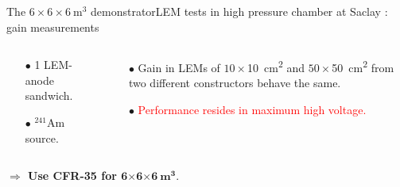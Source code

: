 \documentclass[10pt]{beamer}
\begin{document}
\begin{frame}{The \texorpdfstring{$6 \times 6 \times \SI{6}{\meter\cubed}$}{666} demonstrator}{LEM tests in high pressure chamber at Saclay : gain measurements}
\begin{scriptsize}
\begin{columns}
    			\begin{column}{0.38\textwidth}
    				\begin{itemize}
    					\item[$\bullet$] 1 LEM-anode sandwich.
    					\item[$\bullet$] $^{241}$Am source.
    				\end{itemize}
    			\end{column}\hfill
    			\begin{column}{0.58\textwidth}
    				\begin{itemize}
    					\item[$\bullet$] Gain in LEMs of $10\times$\SI{10}{\centi\meter\squared} and $50\times$\SI{50}{\centi\meter\squared} from two different constructors behave the same.
    					\item[$\bullet$] \textcolor{red}{Performance resides in maximum high voltage.}
    				\end{itemize}
    			\end{column}
    		\end{columns}
    		\vfill
    		\textbf{$\Rightarrow$ Use CFR-35 for $\mathbf{6 \boldsymbol{\times} 6 \boldsymbol{\times} \SI[detect-weight]{6}{\meter\cubed}}$}.\\
    	\end{scriptsize}
    \end{frame}
    
\end{document}
